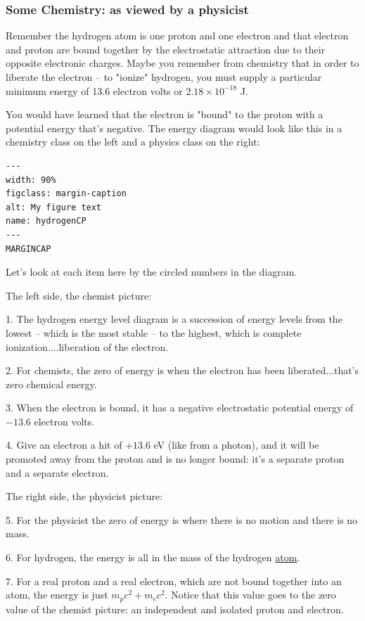 \documentclass[
]{article}
\begin{document}
\hypertarget{some-chemistry-as-viewed-by-a-physicist}{%
\subsubsection{Some Chemistry: as viewed by a
physicist}\label{some-chemistry-as-viewed-by-a-physicist}}

Remember the hydrogen atom is one proton and one electron and that
electron and proton are bound together by the electrostatic attraction
due to their opposite electronic charges. Maybe you remember from
chemistry that in order to liberate the electron -- to "ionize"
hydrogen, you must supply a particular minimum energy of 13.6 electron
volts or \(2.18 \times 10^{-18}\) J.

You would have learned that the electron is "bound" to the proton with a
potential energy that's negative. The energy diagram would look like
this in a chemistry class on the left and a physics class on the right:

\begin{verbatim}
---
width: 90%
figclass: margin-caption
alt: My figure text
name: hydrogenCP
---
MARGINCAP
\end{verbatim}

Let's look at each item here by the circled numbers in the diagram.

The left side, the chemist picture:

1. The hydrogen energy level diagram is a succession of energy levels
from the lowest -- which is the most stable -- to the highest, which is
complete ionization....liberation of the electron.

2. For chemists, the zero of energy is when the electron has been
liberated...that's zero chemical energy.

3. When the electron is bound, it has a negative electrostatic potential
energy of \(-13.6\) electron volts.

4. Give an electron a hit of \(+13.6\) eV (like from a photon), and it
will be promoted away from the proton and is no longer bound: it's a
separate proton and a separate electron.

The right side, the physicist picture:

5. For the physicist the zero of energy is where there is no motion and
there is no mass.

6. For hydrogen, the energy is all in the mass of the hydrogen
\underline{atom}.

7. For a real proton and a real electron, which are not bound together
into an atom, the energy is just \(m_pc^2 + m_ec^2\). Notice that this
value goes to the zero value of the chemist picture: an independent and
isolated proton and electron.
\end{document}
